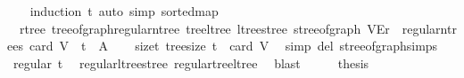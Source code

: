 \begin{isabellebody}
%
\isadelimproof
\ \ %
\endisadelimproof
%
\isatagproof
{}\isamarkupfalse%
\ {\isacharparenleft}{\kern0pt}induction\ t{\isacharparenright}{\kern0pt}\ {\isacharparenleft}{\kern0pt}auto\ simp{\isacharcolon}{\kern0pt}\ sorted{\isacharunderscore}{\kern0pt}map{\isacharparenright}{\kern0pt}%
\endisatagproof
{\isafoldproof}%
%
\isadelimproof
\isanewline
%
\endisadelimproof
\isanewline
{}\isamarkupfalse%
\ {\isacharparenleft}{\kern0pt}\ rtree{\isacharparenright}{\kern0pt}\ tree{\isacharunderscore}{\kern0pt}of{\isacharunderscore}{\kern0pt}graph{\isacharunderscore}{\kern0pt}regular{\isacharunderscore}{\kern0pt}n{\isacharunderscore}{\kern0pt}tree{\isacharcolon}{\kern0pt}\ {\isachardoublequoteopen}tree{\isacharunderscore}{\kern0pt}ltree\ {\isacharparenleft}{\kern0pt}ltree{\isacharunderscore}{\kern0pt}stree\ {\isacharparenleft}{\kern0pt}stree{\isacharunderscore}{\kern0pt}of{\isacharunderscore}{\kern0pt}graph\ {\isacharparenleft}{\kern0pt}V{\isacharcomma}{\kern0pt}E{\isacharcomma}{\kern0pt}r{\isacharparenright}{\kern0pt}{\isacharparenright}{\kern0pt}{\isacharparenright}{\kern0pt}\ {\isasymin}\ regular{\isacharunderscore}{\kern0pt}n{\isacharunderscore}{\kern0pt}trees\ {\isacharparenleft}{\kern0pt}card\ V{\isacharparenright}{\kern0pt}{\isachardoublequoteclose}\ {\isacharparenleft}{\kern0pt}\ {\isachardoublequoteopen}{\isacharquery}{\kern0pt}t\ {\isasymin}\ {\isacharquery}{\kern0pt}A{\isachardoublequoteclose}{\isacharparenright}{\kern0pt}\isanewline
%
\isadelimproof
%
\endisadelimproof
%
\isatagproof
{}\isamarkupfalse%
{\isacharminus}{\kern0pt}\isanewline
\ \ \isamarkupfalse%
\ size{\isacharunderscore}{\kern0pt}t{\isacharcolon}{\kern0pt}\ {\isachardoublequoteopen}tree{\isacharunderscore}{\kern0pt}size\ {\isacharquery}{\kern0pt}t\ {\isacharequal}{\kern0pt}\ card\ V{\isachardoublequoteclose}\ \isamarkupfalse%
\ {\isacharparenleft}{\kern0pt}simp\ del{\isacharcolon}{\kern0pt}\ stree{\isacharunderscore}{\kern0pt}of{\isacharunderscore}{\kern0pt}graph{\isachardot}{\kern0pt}simps{\isacharparenright}{\kern0pt}\isanewline
\ \ \isamarkupfalse%
\ {\isachardoublequoteopen}regular\ {\isacharquery}{\kern0pt}t{\isachardoublequoteclose}\ \isamarkupfalse%
\ regular{\isacharunderscore}{\kern0pt}ltree{\isacharunderscore}{\kern0pt}stree\ regular{\isacharunderscore}{\kern0pt}tree{\isacharunderscore}{\kern0pt}ltree\ \isamarkupfalse%
\ blast\isanewline
\ \ \isamarkupfalse%
\ \isamarkupfalse%
\ {\isacharquery}{\kern0pt}thesis\ \isamarkupfalse%

\end{isabellebody}
